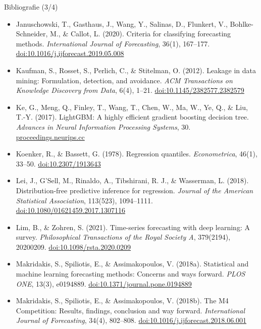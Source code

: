 \begin{frame}{Bibliografie (3/4)}
\itemsize{\scriptsize}
\begin{itemize}
    \item Januschowski, T., Gasthaus, J., Wang, Y., Salinas, D., Flunkert, V., Bohlke-Schneider, M., \& Callot, L. (2020). Criteria for classifying forecasting methods. \textit{International Journal of Forecasting}, 36(1), 167--177. \href{https://doi.org/10.1016/j.ijforecast.2019.05.008}{doi:10.1016/j.ijforecast.2019.05.008}
    \item Kaufman, S., Rosset, S., Perlich, C., \& Stitelman, O. (2012). Leakage in data mining: Formulation, detection, and avoidance. \textit{ACM Transactions on Knowledge Discovery from Data}, 6(4), 1--21. \href{https://doi.org/10.1145/2382577.2382579}{doi:10.1145/2382577.2382579}
    \item Ke, G., Meng, Q., Finley, T., Wang, T., Chen, W., Ma, W., Ye, Q., \& Liu, T.-Y. (2017). LightGBM: A highly efficient gradient boosting decision tree. \textit{Advances in Neural Information Processing Systems}, 30. \href{https://proceedings.neurips.cc/paper/2017/hash/6449f44a102fde848669bdd9eb6b76fa-Abstract.html}{proceedings.neurips.cc}
    \item Koenker, R., \& Bassett, G. (1978). Regression quantiles. \textit{Econometrica}, 46(1), 33--50. \href{https://doi.org/10.2307/1913643}{doi:10.2307/1913643}
    \item Lei, J., G'Sell, M., Rinaldo, A., Tibshirani, R. J., \& Wasserman, L. (2018). Distribution-free predictive inference for regression. \textit{Journal of the American Statistical Association}, 113(523), 1094--1111. \href{https://doi.org/10.1080/01621459.2017.1307116}{doi:10.1080/01621459.2017.1307116}
    \item Lim, B., \& Zohren, S. (2021). Time-series forecasting with deep learning: A survey. \textit{Philosophical Transactions of the Royal Society A}, 379(2194), 20200209. \href{https://doi.org/10.1098/rsta.2020.0209}{doi:10.1098/rsta.2020.0209}
    \item Makridakis, S., Spiliotis, E., \& Assimakopoulos, V. (2018a). Statistical and machine learning forecasting methods: Concerns and ways forward. \textit{PLOS ONE}, 13(3), e0194889. \href{https://doi.org/10.1371/journal.pone.0194889}{doi:10.1371/journal.pone.0194889}
    \item Makridakis, S., Spiliotis, E., \& Assimakopoulos, V. (2018b). The M4 Competition: Results, findings, conclusion and way forward. \textit{International Journal of Forecasting}, 34(4), 802--808. \href{https://doi.org/10.1016/j.ijforecast.2018.06.001}{doi:10.1016/j.ijforecast.2018.06.001}
\end{itemize}
\end{frame}

